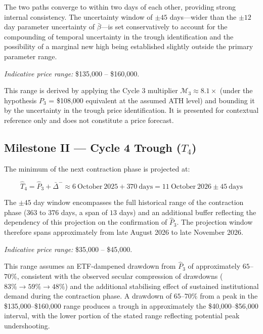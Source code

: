 The two paths converge to within two days of each other, providing strong
internal consistency. The uncertainty window of $\pm 45$ days---wider than the
$\pm 12$ day parameter uncertainty of $\bar{\beta}$---is set conservatively to
account for the compounding of temporal uncertainty in the trough identification
and the possibility of a marginal new high being established slightly outside
the primary parameter range.

\medskip
\noindent\textit{Indicative price range:} \$135,000 -- \$160,000.

This range is derived by applying the Cycle 3 multiplier
$\mathcal{M}_3 \approx 8.1\times$ (under the hypothesis $P_3$ = \$108,000
equivalent at the assumed ATH level) and bounding it by the uncertainty in
the trough price identification. It is presented for contextual reference only
and does not constitute a price forecast.

\subsection{Milestone II --- Cycle 4 Trough ($T_4$)}

The minimum of the next contraction phase is projected at:

\begin{equation}
  \hat{T}_4 = \hat{P}_3 + \bar{\Delta}^{-}
            \approx 6\ \text{October}\ 2025 + 370\ \text{days}
            = 11\ \text{October}\ 2026
            \pm 45\ \text{days}
  \label{eq:t4_projection}
\end{equation}

The $\pm 45$ day window encompasses the full historical range of the
contraction phase ($363$ to $376$ days, a span of $13$ days) and an additional
buffer reflecting the dependency of this projection on the confirmation of
$\hat{P}_3$. The projection window therefore spans approximately from
late August 2026 to late November 2026.

\medskip
\noindent\textit{Indicative price range:} \$35,000 -- \$45,000.

This range assumes an ETF-dampened drawdown from $\hat{P}_3$ of approximately
$65$--$70\%$, consistent with the observed secular compression of drawdowns
($83\% \to 59\% \to 48\%$) and the additional stabilising effect of
sustained institutional demand during the contraction phase. A drawdown of
$65$--$70\%$ from a peak in the \$135,000--\$160,000 range produces a trough
in approximately the \$40,000--\$56,000 interval, with the lower portion of
the stated range reflecting potential peak undershooting.

